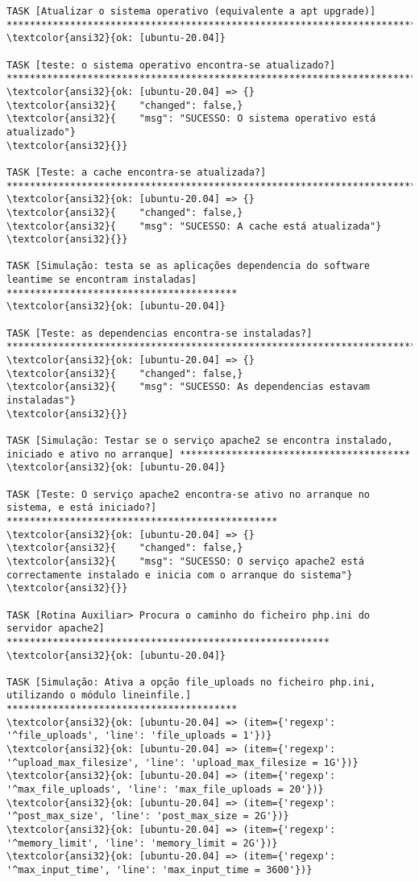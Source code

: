 \documentclass{scrartcl}
\begin{document}
\begin{Verbatim}
TASK [Atualizar o sistema operativo (equivalente a apt upgrade)] *************************************************************************
\textcolor{ansi32}{ok: [ubuntu-20.04]}

TASK [teste: o sistema operativo encontra-se atualizado?] ********************************************************************************
\textcolor{ansi32}{ok: [ubuntu-20.04] => {}
\textcolor{ansi32}{    "changed": false,}
\textcolor{ansi32}{    "msg": "SUCESSO: O sistema operativo está atualizado"}
\textcolor{ansi32}{}}

TASK [Teste: a cache encontra-se atualizada?] ********************************************************************************************
\textcolor{ansi32}{ok: [ubuntu-20.04] => {}
\textcolor{ansi32}{    "changed": false,}
\textcolor{ansi32}{    "msg": "SUCESSO: A cache está atualizada"}
\textcolor{ansi32}{}}

TASK [Simulação: testa se as aplicações dependencia do software leantime se encontram instaladas] ****************************************
\textcolor{ansi32}{ok: [ubuntu-20.04]}

TASK [Teste: as dependencias encontra-se instaladas?] ************************************************************************************
\textcolor{ansi32}{ok: [ubuntu-20.04] => {}
\textcolor{ansi32}{    "changed": false,}
\textcolor{ansi32}{    "msg": "SUCESSO: As dependencias estavam instaladas"}
\textcolor{ansi32}{}}

TASK [Simulação: Testar se o serviço apache2 se encontra instalado, iniciado e ativo no arranque] ****************************************
\textcolor{ansi32}{ok: [ubuntu-20.04]}

TASK [Teste: O serviço apache2 encontra-se ativo no arranque no sistema, e está iniciado?] ***********************************************
\textcolor{ansi32}{ok: [ubuntu-20.04] => {}
\textcolor{ansi32}{    "changed": false,}
\textcolor{ansi32}{    "msg": "SUCESSO: O serviço apache2 está correctamente instalado e inicia com o arranque do sistema"}
\textcolor{ansi32}{}}

TASK [Rotina Auxiliar> Procura o caminho do ficheiro php.ini do servidor apache2] ********************************************************
\textcolor{ansi32}{ok: [ubuntu-20.04]}

TASK [Simulação: Ativa a opção file_uploads no ficheiro php.ini, utilizando o módulo lineinfile.] ****************************************
\textcolor{ansi32}{ok: [ubuntu-20.04] => (item={'regexp': '^file_uploads', 'line': 'file_uploads = 1'})}
\textcolor{ansi32}{ok: [ubuntu-20.04] => (item={'regexp': '^upload_max_filesize', 'line': 'upload_max_filesize = 1G'})}
\textcolor{ansi32}{ok: [ubuntu-20.04] => (item={'regexp': '^max_file_uploads', 'line': 'max_file_uploads = 20'})}
\textcolor{ansi32}{ok: [ubuntu-20.04] => (item={'regexp': '^post_max_size', 'line': 'post_max_size = 2G'})}
\textcolor{ansi32}{ok: [ubuntu-20.04] => (item={'regexp': '^memory_limit', 'line': 'memory_limit = 2G'})}
\textcolor{ansi32}{ok: [ubuntu-20.04] => (item={'regexp': '^max_input_time', 'line': 'max_input_time = 3600'})}


\end{Verbatim}
\end{document}
